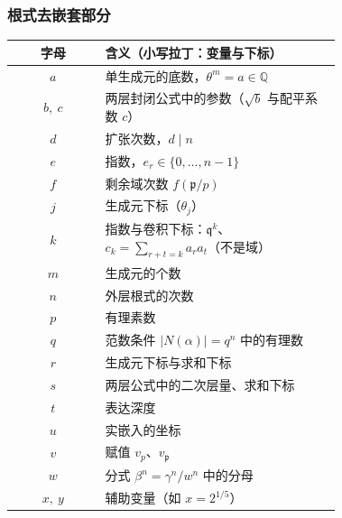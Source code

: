 \documentclass[UTF8,a4paper,11pt]{ctexart}
\begin{document}
\subsubsection{根式去嵌套部分}

\begin{center}
\begin{tabular}{c|>{\raggedright\arraybackslash}p{0.72\linewidth}}
\toprule
字母 & 含义（小写拉丁：变量与下标） \\
\midrule
$a$ & 单生成元的底数，$\theta^m=a\in\mathbb{Q}$ \\
$b,\ c$ & 两层封闭公式中的参数（$\sqrt b$ 与配平系数 $c$） \\
$d$ & 扩张次数，$d\mid n$ \\
$e$ & 指数，$e_r\in\{0,\dots,n-1\}$ \\
$f$ & 剩余域次数 $f(\mathfrak{p}/p)$ \\
$j$ & 生成元下标（$\theta_j$） \\
$k$ & 指数与卷积下标：$\mathfrak{q}^k$、$c_k=\sum_{r+t=k}a_ra_t$（不是域） \\
$m$ & 生成元的个数 \\
$n$ & 外层根式的次数 \\
$p$ & 有理素数 \\
$q$ & 范数条件 $|N(\alpha)|=q^n$ 中的有理数 \\
$r$ & 生成元下标与求和下标 \\
$s$ & 两层公式中的二次层量、求和下标 \\
$t$ & 表达深度 \\
$u$ & 实嵌入的坐标 \\
$v$ & 赋值 $v_p$、$v_{\mathfrak{p}}$ \\
$w$ & 分式 $\beta^n=\gamma^n/w^n$ 中的分母 \\
$x,\ y$ & 辅助变量（如 $x=2^{1/5}$） \\
\bottomrule
\end{tabular}
\end{center}
\end{document}

